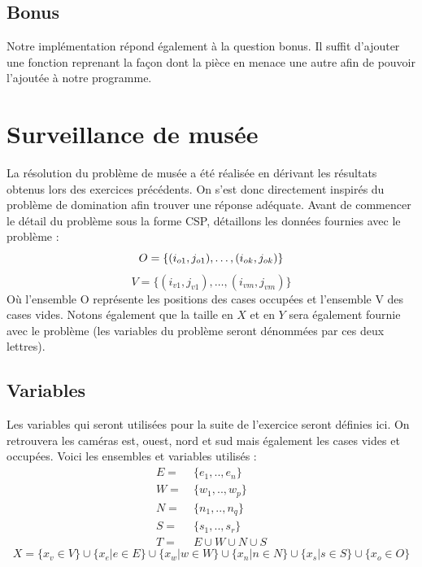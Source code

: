 \documentclass[a4paper]{article}
\begin{document}
\subsection{Bonus}
Notre implémentation répond également à la question bonus. Il suffit d'ajouter une fonction reprenant la façon dont la pièce en menace une autre afin de pouvoir l'ajoutée à notre programme.

\section{Surveillance de musée}
La résolution du problème de musée a été réalisée en dérivant les résultats obtenus lors des exercices précédents. On s'est donc directement inspirés du problème de domination afin trouver une réponse adéquate. Avant de commencer le détail du problème sous la forme CSP, détaillons les données fournies avec le problème : 
\begin{equation*}
O = \{(i_{o1},j_{o1}),\ldots,(i_{ok},j_{ok}) \} \vspace{0.1cm} 
\end{equation*}
\begin{equation*}
V = \{ (i_{v1},j_{v1}),\ldots,(i_{vm},j_{vm}) \}
\end{equation*}
Où l'ensemble O représente les positions des cases occupées et l'ensemble V des cases vides. Notons également que la taille en $X$ et en $Y$ sera également fournie avec le problème (les variables du problème seront dénommées par ces deux lettres).
\subsection{Variables}
Les variables qui seront utilisées pour la suite de l'exercice seront définies ici. On retrouvera les caméras est, ouest, nord et sud mais également les cases vides et occupées. Voici les ensembles et variables utilisés : 
\begin{align*}
E =& \ \{ e_1,.., e_n \} \\
W =& \  \{ w_1,.., w_p \} \\
N =& \  \{ n_1,.., n_q \} \\
S =& \  \{ s_1,.., s_r \} \\
T =& \ E \cup W \cup N \cup S
\end{align*}
\begin{equation*}
X = \{x_v \in V \} \cup \{x_e | e \in E \} \cup \{x_w | w \in W\} \cup \{x_n | n \in N\} \cup \{x_s | s \in S \} \cup \{x_o \in O\} 
\end{equation*}
\end{document}

